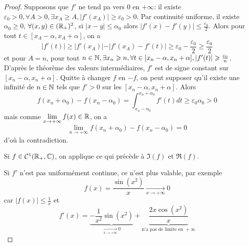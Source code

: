 \begin{proof}
	Supposons que $f'$ ne tend pa vers 0 en $+\infty$: il existe $\varepsilon_{0}>0,\forall A>0,\exists x_{A}\geqslant A,\vert f'(x_{A})\vert\geqslant\varepsilon_{0}>0$. Par continuité uniforme, il existe $\alpha_{0}\geqslant0$, $\forall(x,y)\in(\mathbb{R}_{+})^{2}$, si $\vert x-y\vert\leqslant\alpha_{0}$ alors $\vert f'(x)-f'(y)\vert\leqslant\frac{\varepsilon_{0}}{2}$. Alors pour tout $t\in[x_{A}-\alpha,x_{A}+\alpha]$, on a 
	\begin{equation}\vert f'(t)\vert\geqslant \vert f'(x_{A})\vert-\vert f'(x_{A})-f'(t)\vert\geqslant\varepsilon_{0}-\frac{\varepsilon_{0}}{2}\geqslant\frac{\varepsilon_{0}}{2}\end{equation}
	et pour $A=n$, pour tout $n\in\mathbb{N},\exists x_{n}\geqslant n,\forall t\in[x_{n}-\alpha,x_{n}+\alpha],\vert f'(t)\vert\geqslant\frac{\varepsilon_{0}}{n}$. D'après le théorème des valeurs intermédiaires, $f'$ est de signe constant sur $[x_{n}-\alpha,x_{n}+\alpha]$. Quitte à changer $f$ en $-f$, on peut supposer qu'il existe une infinité de $n\in\mathbb{N}$ tels que $f'>0$ sur les $[x_{n}-\alpha,x_{n}+\alpha]$. Alors
	\begin{equation}f(x_{n}+\alpha_{0})-f(x_{n}-\alpha_{0})=\int_{x_{n}-\alpha_{0}}^{x_{n}+\alpha_{0}}f'(t)dt\geqslant\varepsilon_{0}\alpha_{0}>0\end{equation}
	mais comme $\lim\limits_{x\to+\infty}f(x)\in\mathbb{R}$, on a 
	\begin{equation}\lim\limits_{n\to+\infty}f(x_{n}+\alpha_{0})-f(x_{n}-\alpha_{0})=0\end{equation}
	d'où la contradiction.

	Si $f\in\mathcal{C}^{1}(\mathbb{R}_{+},\mathbb{C})$, on applique ce qui précède à $\Im(f)$ et $\Re(f)$. 

	Si $f'$ n'est pas uniformément continue, ce n'est plus valable, par exemple 
	\begin{equation}f(x)=\frac{\sin(x^{2})}{x}\xrightarrow[x\to+\infty]{}0\end{equation}
	car $\vert f(x)\vert\leqslant\frac{1}{x}$ et 
	\begin{equation}f'(x)=\underbrace{-\frac{1}{x^{2}}\sin(x^{2})}_{\xrightarrow[x\to+\infty]{}0}+\underbrace{\frac{2x\cos(x^{2})}{x}}_{\text{n'a pas de limite en }+\infty}\end{equation}
\end{proof}


